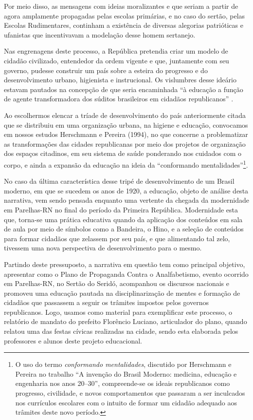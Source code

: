 \begin{refsection}
Por meio disso, as mensagens com ideias moralizantes e que seriam a partir de agora amplamente propagadas pelas escolas primárias, e no caso do sertão, pelas Escolas Rudimentares, continham a existência de diversas alegorias patrióticas e ufanistas que incentivavam a modelação desse homem sertanejo. 

Nas engrenagens deste processo, a República pretendia criar um modelo de cidadão civilizado, entendedor da ordem vigente e que, juntamente com seu governo, pudesse construir um país sobre a esteira do progresso e do desenvolvimento urbano, higienista e instrucional. Os vislumbres desse ideário estavam pautados na concepção de que seria encaminhada ``à educação a função de agente transformadora dos súditos brasileiros em cidadãos republicanos'' \cite[p.~81]{Stamatto2005Escola}.

Ao escolhermos elencar a tríade de desenvolvimento do país anteriormente citada que se distribuiu em uma organização urbana, na higiene e educação, convocamos em nossos estudos Herschmann e Pereira (1994), no que concerne a problematizar as transformações das cidades republicanas por meio dos projetos de organização dos espaços citadinos, em seu sistema de saúde ponderando nos cuidados com o corpo, e ainda a expansão da educação na ideia da ``conformando mentalidades''\footnote{O uso do termo \textit{conformando mentalidades}, discutido por Herschmann e Pereira \citeyear{HerschmannAndPereira1994Invencao} no trabalho ``A invenção do Brasil Moderno: medicina, educação e engenharia nos anos 20--30'', compreende-se os ideais republicanos como progresso, civilidade, e novos comportamentos que passaram a ser inculcados nos currículos escolares com o intuito de formar um cidadão adequado aos trâmites deste novo período.}.

No caso da última característica desse tripé de desenvolvimento de um Brasil moderno, em que se sucedem os anos de 1920, a educação, objeto de análise desta narrativa, vem sendo pensada enquanto uma vertente da chegada da modernidade em Parelhas-RN no final do período da Primeira República. Modernidade esta que, torna-se uma prática educativa quando da aplicação dos conteúdos em sala de aula por meio de símbolos como a Bandeira, o Hino, e a seleção de conteúdos para formar cidadãos que zelassem por seu país, e que alimentando tal zelo, tivessem uma nova perspectiva de desenvolvimento para o mesmo.

Partindo deste pressuposto, a narrativa em questão tem como principal objetivo, apresentar como o Plano de Propaganda Contra o Analfabetismo, evento ocorrido em Parelhas-RN, no Sertão do Seridó, acompanhou os discursos nacionais e promoveu uma educação pautada na disciplinarização de mentes e formação de cidadãos que passassem a seguir os trâmites impostos pelos governos republicanos. Logo, usamos como material para exemplificar este processo, o relatório de mandato do prefeito Florêncio Luciano, articulador do plano, quando relatou uma das festas cívicas realizadas na cidade, sendo esta elaborada pelos professores e alunos deste projeto educacional. 


\end{refsection}
